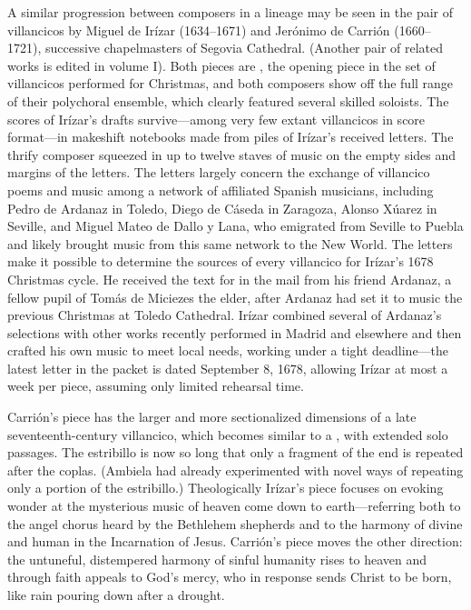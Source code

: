 A similar progression between composers in a lineage may be seen in the pair
of villancicos by Miguel de Irízar (1634--1671) and Jerónimo de Carrión
(1660--1721), successive chapelmasters of Segovia Cathedral.%
    \Autocite{Cashner:Segovia}
(Another pair of related works is edited in volume I).
Both pieces are , the opening piece in the set of
villancicos performed for Christmas, and both composers show off the full
range of their polychoral ensemble, which clearly featured several skilled
soloists.
The scores of Irízar's drafts survive---among very few extant villancicos in
score format---in makeshift notebooks made from piles of Irízar's received
letters.
The thrify composer squeezed in up to twelve staves of music on the empty
sides and margins of the letters.
The letters largely concern the exchange of villancico poems and music among a
network of affiliated Spanish musicians, including Pedro de Ardanaz in Toledo,
Diego de Cáseda in Zaragoza, Alonso Xúarez in Seville, and Miguel Mateo
de Dallo y Lana, who emigrated from Seville to Puebla and likely brought music
from this same network to the New World.
The letters make it possible to determine the sources of every villancico for
Irízar's 1678 Christmas cycle.%
    \Autocites
    {Rodriguez:Networks}
    {Rodriguez:SoloMadrid}
He received the text for  in the mail from his
friend Ardanaz, a fellow pupil of Tomás de Miciezes the elder, after Ardanaz
had set it to music the previous Christmas at Toledo Cathedral.
Irízar combined several of Ardanaz's selections with other works recently
performed in Madrid and elsewhere and then crafted his own music to meet local
needs, working under a tight deadline---the latest letter in the packet is
dated September 8, 1678, allowing Irízar at most a week per piece, assuming
only limited rehearsal time.

Carrión's piece has the larger and more sectionalized dimensions of a late
seventeenth-century villancico, which becomes similar to a ,
with extended solo passages.
The estribillo is now so long that only a fragment of the end is repeated
after the coplas.
(Ambiela had already experimented with novel ways of repeating only a portion
of the estribillo.)%
    \Autocites
    {Calahorra:Suban}
    {Torrente:Estribillo}
Theologically Irízar's piece focuses on evoking wonder at the mysterious music
of heaven come down to earth---referring both to the angel chorus heard by the
Bethlehem shepherds and to the harmony of divine and human in the Incarnation
of Jesus.
Carrión's piece moves the other direction: the untuneful, distempered harmony
of sinful humanity rises to heaven and through faith appeals to God's mercy,
who in response sends Christ to be born, like rain pouring down after a
drought.

